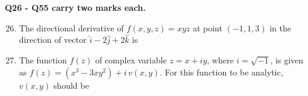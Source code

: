 \documentclass[12pt,onecolumn]{article}
\begin{document}
\noindent\textbf{Q26 - Q55 carry two marks each.}
\begin{enumerate}
    \setcounter{enumi}{25}
    \item The directional derivative of $f(x, y, z) = xyz$ at point $(-1, 1, 3)$ in the direction of vector $\hat{i} - 2\hat{j} + 2\hat{k}$ is
          \begin{enumerate}
          \end{enumerate}

    \item The function $f(z)$ of complex variable $z = x + i y$, where $i = \sqrt{-1}$, is given as $f(z) = (x^3 - 3x y^2) + i\, v(x, y)$. For this function to be analytic, $v(x, y)$ should be
          \begin{enumerate}
          \end{enumerate}


\end{enumerate}
\end{document}
